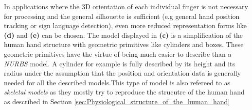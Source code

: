 In applications where the 3D orientation of each individual finger is not necessary for processing and the general silhouette is sufficient (e.g general hand position tracking or sign language detection), even more reduced representation forms like \textbf{(d)} and \textbf{(e)} can be chosen.
The model displayed in \textbf{(c)} is a simplification of the human hand structure with geometric primitives like cylinders and boxes. These geometric primitives have the virtue of being much easier to describe than a \textit{NURBS} model. A cylinder for example is fully described by its height and its radius under the assumption that the position and orientation data is generally needed for all the described models.This type of model is also refereed to as \textit{skeletal models} as they mostly try to reproduce the strucutre of the human hand as described in Section \ref{sec:Physiological_structure_of_the_human_hand}





